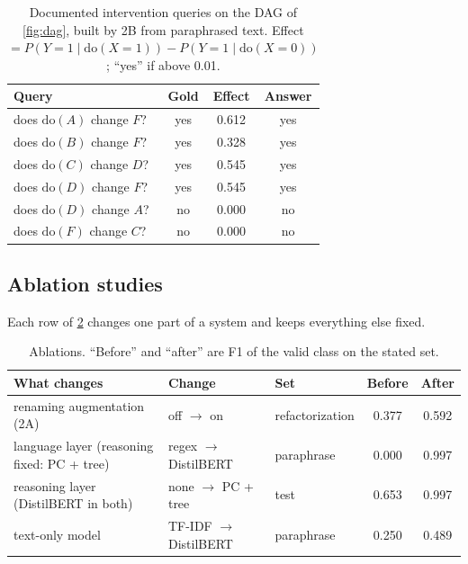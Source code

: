 \documentclass[12pt,a4paper]{article}
\newcommand{\thead}[1]{\textbf{#1}}
\newcommand{\doop}{\mathrm{do}}
\begin{document}
\begin{table}[!htbp]
\centering\small
\caption{Documented intervention queries on the DAG of \cref{fig:dag}, built by 2B from paraphrased text.
Effect $=P(Y{=}1\mid\doop(X{=}1))-P(Y{=}1\mid\doop(X{=}0))$; ``yes'' if above 0.01.}
\label{tab:queries}
\begin{tabular}{@{}lccc@{}}
\toprule
\thead{Query} & \thead{Gold} & \thead{Effect} & \thead{Answer} \\
\midrule
does $\doop(A)$ change $F$? & yes & 0.612 & yes \\
\rowcolor{rowtint} does $\doop(B)$ change $F$? & yes & 0.328 & yes \\
does $\doop(C)$ change $D$? & yes & 0.545 & yes \\
\rowcolor{rowtint} does $\doop(D)$ change $F$? & yes & 0.545 & yes \\
does $\doop(D)$ change $A$? & no & 0.000 & no \\
\rowcolor{rowtint} does $\doop(F)$ change $C$? & no & 0.000 & no \\
\bottomrule
\end{tabular}
\end{table}

\subsection{Ablation studies}\label{sec:ablation}
Each row of \cref{tab:ablation} changes one part of a system and keeps everything else fixed.

\begin{table}[!htbp]
\centering\small
\caption{Ablations. ``Before'' and ``after'' are F1 of the valid class on the stated set.}
\label{tab:ablation}
\begin{tabularx}{\linewidth}{@{}>{\raggedright}X>{\raggedright}p{3.0cm}lcc@{}}
\toprule
\thead{What changes} & \thead{Change} & \thead{Set} & \thead{Before} & \thead{After} \\
\midrule
renaming augmentation (2A) & off $\rightarrow$ on & refactorization & 0.377 & 0.592 \\
\rowcolor{rowtint} language layer (reasoning fixed: PC + tree) & regex $\rightarrow$ DistilBERT & paraphrase & 0.000 & 0.997 \\
reasoning layer (DistilBERT in both) & none $\rightarrow$ PC + tree & test & 0.653 & 0.997 \\
\rowcolor{rowtint} text-only model & TF-IDF $\rightarrow$ DistilBERT & paraphrase & 0.250 & 0.489 \\
\bottomrule
\end{tabularx}
\end{table}
\end{document}
